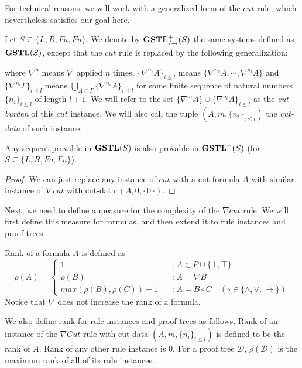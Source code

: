 \documentclass[12pt,a4paper]{article}
\begin{document}
For technical reasons, we will work with a generalized form of the $cut$ rule, which nevertheless satisfies our goal here.

\begin{dfn}\label{def:n-cut}
	Let $S \subseteq \{L, R, Fa, Fu\}$. We denote by $\mathbf{GSTL}^+_{/\rightarrow}(S)$ the same systems defined as $\mathbf{GSTL}(S)$, except that the $cut$ rule is replaced by the following generalization:
	\begin{prooftree}
	\end{prooftree}
	where $\nabla^n$ means $\nabla$ applied $n$ times, $\{\nabla^{n_i} A\}_{i \leq l}$ means $\{\nabla^{n_0} A,\dotsb, \nabla^{n_l} A\}$ and $\{\nabla^{n_i} \Gamma\}_{i \leq l}$ means $\bigcup_{A \in \Gamma} \{\nabla^{n_i} A\}_{i \leq l}$ for some finite sequence of natural numbers $\{n_i\}_{i \leq l}$ of length $l+1$.
	We will refer to the set $\{\nabla^m A\} \cup \{\nabla^{n_i} A\}_{i \leq l}$ as the \emph{cut-burden} of this $cut$ instance. We will also call the tuple $(A, m, \{n_i\}_{i \leq l})$ the \emph{cut-data} of such instance.
\end{dfn}

\begin{thm}\label{cor:nc-riddance} Any sequent provable in $\mathbf{GSTL}(S)$ is also provable in $\mathbf{GSTL}^+(S)$ (for $S \subseteq \{L, R, Fa, Fu\}$).
\end{thm}
\begin{proof}
	We can just replace any instance of $cut$ with a cut-formula $A$ with similar instance of $\nabla cut$ with cut-data $(A, 0, \{0\})$.
\end{proof}

Next, we need to define a measure for the complexity of the $\nabla cut$ rule. We will first define this measure for formulas, and then extend it to rule instances and proof-trees.

\begin{dfn}[Rank]
	Rank of a formula $A$ is defined as
	\[ \rho(A) = \begin{cases}
	1 & \quad ; A \in P \cup \{ \bot, \top \} \\
	\rho(B) & \quad ; A = \nabla B \\
	max(\rho(B), \rho(C)) + 1 & \quad ; A = B \circ C \quad (\circ \in \{ \land, \lor, \rightarrow \})
	\end{cases} \]
	Notice that $\nabla$ does not increase the rank of a formula.
	
	We also define rank for rule instances and proof-trees as follows. Rank of an instance of the $\nabla Cut$ rule with cut-data $(A, m, \{n_i\}_{i \leq l})$ is defined to be the rank of $A$. Rank of any other rule instance is $0$.
	For a proof tree $\mathcal{D}$, $\rho(\mathcal{D})$ is the maximum rank of all of its rule instances.
\end{dfn}
\end{document}
